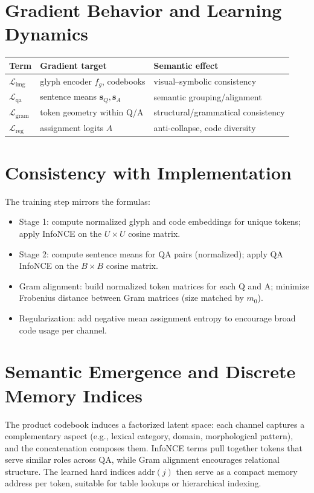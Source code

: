 \documentclass[11pt]{article}
\begin{document}
\section{Gradient Behavior and Learning Dynamics}
\begin{center}
\begin{tabular}{@{}lll@{}}
\toprule
Term & Gradient target & Semantic effect \\
\midrule
\(\mathcal{L}_{\text{img}}\) & glyph encoder \(f_g\), codebooks & visual--symbolic consistency \\
\(\mathcal{L}_{\text{qa}}\) & sentence means \(\mathbf{s}_Q,\mathbf{s}_A\) & semantic grouping/alignment \\
\(\mathcal{L}_{\text{gram}}\) & token geometry within Q/A & structural/grammatical consistency \\
\(\mathcal{L}_{\text{reg}}\) & assignment logits \(A\) & anti-collapse, code diversity \\
\bottomrule
\end{tabular}
\end{center}

\section{Consistency with Implementation}
The training step mirrors the formulas:
\begin{itemize}
  \item Stage 1: compute normalized glyph and code embeddings for unique tokens; apply InfoNCE on the \(U\times U\) cosine matrix.
  \item Stage 2: compute sentence means for QA pairs (normalized); apply QA InfoNCE on the \(B\times B\) cosine matrix.
  \item Gram alignment: build normalized token matrices for each Q and A; minimize Frobenius distance between Gram matrices (size matched by \(m_0\)).
  \item Regularization: add negative mean assignment entropy to encourage broad code usage per channel.
\end{itemize}

\section{Semantic Emergence and Discrete Memory Indices}
The product codebook induces a factorized latent space: each channel captures a complementary aspect (e.g., lexical category, domain, morphological pattern), and the concatenation composes them. InfoNCE terms pull together tokens that serve similar roles across QA, while Gram alignment encourages relational structure. The learned hard indices \(\text{addr}(j)\) then serve as a compact memory address per token, suitable for table lookups or hierarchical indexing.
\end{document}
